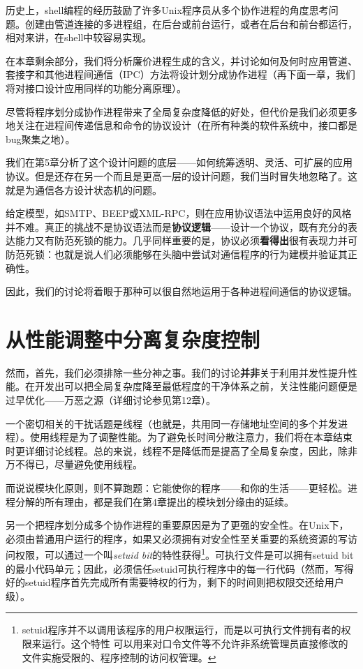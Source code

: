 \documentclass[12pt,oneside]{ctexbook}
\begin{document}
\begin{common-format}
历史上，shell编程的经历鼓励了许多Unix程序员从多个协作进程的角度思考问题。创建由管道连接的多进程组，在后台或前台运行，或者在后台和前台都运行，相对来讲，在shell中较容易实现。

在本章剩余部分，我们将分析廉价进程生成的含义，并讨论如何及何时应用管道、套接字和其他进程间通信（IPC）方法将设计划分成协作进程（再下面一章，我们将对接口设计应用同样的功能分离原理）。

尽管将程序划分成协作进程带来了全局复杂度降低的好处，但代价是我们必须更多地关注在进程间传递信息和命令的协议设计（在所有种类的软件系统中，接口都是bug聚集之地）。

我们在第5章分析了这个设计问题的底层——如何统筹透明、灵活、可扩展的应用协议。但是还存在另一个而且是更高一层的设计问题，我们当时冒失地忽略了。这就是为通信各方设计状态机的问题。

给定模型，如SMTP、BEEP或XML-RPC，则在应用协议语法中运用良好的风格并不难。真正的挑战不是协议语法而是\textbf{协议逻辑}——设计一个协议，既有充分的表达能力又有防范死锁的能力。几乎同样重要的是，协议必须\textbf{看得出}很有表现力并可防范死锁：也就是说人们必须能够在头脑中尝试对通信程序的行为建模并验证其正确性。

因此，我们的讨论将着眼于那种可以很自然地运用于各种进程间通信的协议逻辑。

\section{从性能调整中分离复杂度控制}
然而，首先，我们必须排除一些分神之事。我们的讨论\textbf{并非}关于利用并发性提升性能。在开发出可以把全局复杂度降至最低程度的干净体系之前，关注性能问题便是过早优化——万恶之源（详细讨论参见第12章）。

一个密切相关的干扰话题是线程（也就是，共用同一存储地址空间的多个并发进程）。使用线程是为了调整性能。为了避免长时间分散注意力，我们将在本章结束时更详细讨论线程。总的来说，线程不是降低而是提高了全局复杂度，因此，除非万不得已，尽量避免使用线程。

而说说模块化原则，则不算跑题：它能使你的程序——和你的生活——更轻松。进程分解的所有理由，都是我们在第4章提出的模块划分缘由的延续。

另一个把程序划分成多个协作进程的重要原因是为了更强的安全性。在Unix下，必须由普通用户运行的程序，如果又必须拥有对安全性至关重要的系统资源的写访问权限，可以通过一个叫\textit{setuid bit}的特性获得\footnote{setuid程序并不以调用该程序的用户权限运行，而是以可执行文件拥有者的权限来运行。这个特性
可以用来对口令文件等不允许非系统管理员直接修改的文件实施受限的、程序控制的访问权管理。}。可执行文件是可以拥有setuid bit的最小代码单元；因此，必须信任setuid可执行程序中的每一行代码（然而，写得好的setuid程序首先完成所有需要特权的行为，剩下的时间则把权限交还给用户级）。


\end{common-format}
\end{document}
